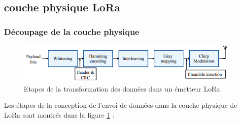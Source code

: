 \subsection{couche physique LoRa}

\subsubsection{Découpage de la couche physique}

\begin{figure}[h]
\centering

\includegraphics[scale=1]{images/physical_lora_rx.PNG}
\caption{Etapes de la transformation des données dans un émetteur LoRa\cite{loraphy}}\label{term4}
\end{figure}


Les étapes de la conception de l'envoi de données dans la couche physique de LoRa sont montrés dans la figure \ref{term4} :

\vspace{0.1cm}

